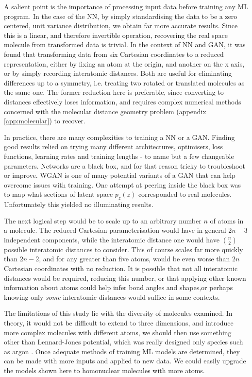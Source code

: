 \documentclass[12pt,a4paper]{article}
\begin{document}
A salient point is the importance of processing input data before training any ML program. In the case of the NN, by simply standardising the data to be a zero centered, unit variance distribution, we obtain far more accurate results. Since this is a linear, and therefore invertible operation, recovering the real space molecule from transformed data is trivial. In the context of NN and GAN, it was found that transforming data from six Cartesian coordinates to a reduced representation, either by fixing an atom at the origin, and another on the x axis, or by simply recording interatomic distances. Both are useful for eliminating differences up to a symmetry, i.e. treating two rotated or translated molecules as the same one. The former reduction here is preferable, since converting to distances effectively loses information, and requires complex numerical methods concerned with the molecular distance geometry problem (appendix \ref{app:molecular}) to recover.

In practice, there are many complexities to training a NN or a GAN. Finding good results relied on trying many different architectures, optimisers, loss functions, learning rates and training lengths - to name but a few changeable parameters. Networks are a black box, and for that reason tricky to troubleshoot or improve. WGAN is one of many potential variants of a GAN that can help overcome issues with training. One attempt at peering inside the black box was to map what sections of latent space $p_z(z)$ corresponded to real molecules. Unfortunately this yielded no illuminating results.

The next logical step would be to scale up to an arbitrary number $n$ of atoms in a molecule. The reduced Cartesian parameterisation would have in general $2n-3$ independent components, while the interatomic distance one would have $n \choose 2$ possible interatomic distances to consider. This of course scales far more quickly than $2n-2$, and for any greater than five atoms, would be even worse than $2n$ Cartesian coordinates with no reduction. It is possible that not all interatomic distances would be required, reducing this number, or that applying other known information about atoms could help infer bond angles and shapes,or  perhaps knowing only \emph{some} interatomic distances would suffice in some contexts.

The limitations of this study lie with the diversity of molecules examined. In theory, it would not be difficult to extend to three dimensions, and introduce more complex molecules with different atoms, we should then use something other than Lennard-Jones potential, which was really designed only species such as argon \cite{Lennard_Jones_1931}. Once adequate methods of training ML models are determined, they can be made with more inputs and applied to new data. We could easily upgrade the models shown here to homonuclear molecules with more atoms.
\end{document}
